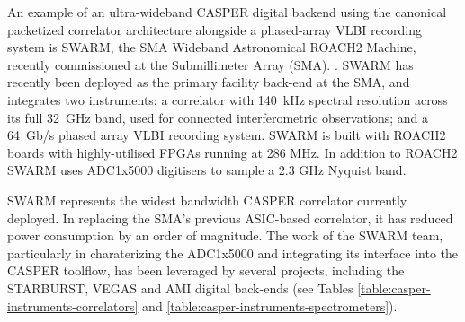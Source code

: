\documentclass{ws-jai}
\begin{document}
An example of an ultra-wideband CASPER digital backend using the canonical packetized correlator architecture alongside a phased-array VLBI recording system is SWARM, the SMA Wideband Astronomical ROACH2 Machine, recently commissioned at the Submillimeter Array (SMA). \citep{swarm}. SWARM has recently been deployed as the primary facility back-end at the SMA, and integrates two instruments: a correlator with 140~kHz spectral resolution across its full 32~GHz band, used for connected interferometric observations; and a 64~Gb/s phased array VLBI recording system. SWARM is built with ROACH2 boards with highly-utilised FPGAs running at 286 MHz. In addition to ROACH2 SWARM uses ADC1x5000 digitisers to sample a 2.3 GHz Nyquist band.

SWARM represents the widest bandwidth CASPER correlator currently deployed. In replacing the SMA's previous ASIC-based correlator, it has reduced power consumption by an order of magnitude. The work of the SWARM team, particularly in charaterizing the ADC1x5000 \citep{adc5g} and integrating its interface into the CASPER toolflow, has been leveraged by several projects, including the STARBURST, VEGAS and AMI digital back-ends (see Tables \ref{table:casper-instruments-correlators} and \ref{table:casper-instruments-spectrometers}).
\end{document}
